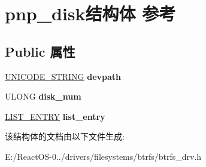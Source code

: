 \hypertarget{structpnp__disk}{}\section{pnp\+\_\+disk结构体 参考}
\label{structpnp__disk}
\subsection*{Public 属性}
\begin{DoxyCompactItemize}
\item 
\mbox{\label{structpnp__disk_aef8f519fc161449651c581b399fe1c4a}} 
\hyperlink{struct___u_n_i_c_o_d_e___s_t_r_i_n_g}{U\+N\+I\+C\+O\+D\+E\+\_\+\+S\+T\+R\+I\+NG} {\bfseries devpath}
\item 
\mbox{\label{structpnp__disk_a03566a5d5280367a64ed4052f4ca6f09}} 
U\+L\+O\+NG {\bfseries disk\+\_\+num}
\item 
\mbox{\label{structpnp__disk_aeb16c7b5ead23491881c2ba420eaac2c}} 
\hyperlink{struct___l_i_s_t___e_n_t_r_y}{L\+I\+S\+T\+\_\+\+E\+N\+T\+RY} {\bfseries list\+\_\+entry}
\end{DoxyCompactItemize}


该结构体的文档由以下文件生成\+:\begin{DoxyCompactItemize}
\item 
E\+:/\+React\+O\+S-\/0../drivers/filesystems/btrfs/btrfs\+\_\+drv.\+h\end{DoxyCompactItemize}
